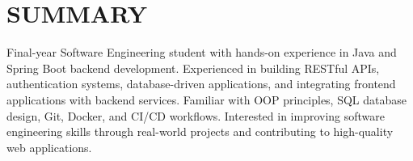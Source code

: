 \section{SUMMARY}
\small
\noindent Final-year Software Engineering student with hands-on experience in Java and Spring Boot backend development. Experienced in building RESTful APIs, authentication systems, database-driven applications, and integrating frontend applications with backend services. Familiar with OOP principles, SQL database design, Git, Docker, and CI/CD workflows. Interested in improving software engineering skills through real-world projects and contributing to high-quality web applications.

\normalsize

